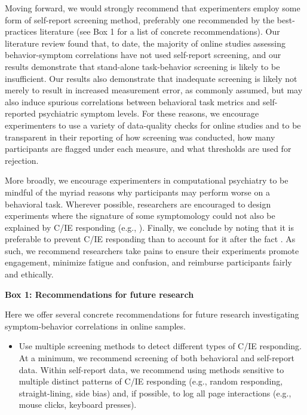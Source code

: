 \documentclass[a4paper,notitlepage,12pt]{article}
\begin{document}
\begin{refsection}[main]
Moving forward, we would strongly recommend that experimenters employ some form of self-report screening method, preferably one recommended by the best-practices literature (see Box 1 for a list of concrete recommendations). Our literature review found that, to date, the majority of online studies assessing behavior-symptom correlations have not used self-report screening, and our results demonstrate that stand-alone task-behavior screening is likely to be insufficient. Our results also demonstrate that inadequate screening is likely not merely to result in increased measurement error, as commonly assumed, but may also induce spurious correlations between behavioral task metrics and self-reported psychiatric symptom levels. For these reasons, we encourage experimenters to use a variety of data-quality checks for online studies and to be transparent in their reporting of how screening was conducted, how many participants are flagged under each measure, and what thresholds are used for rejection.

More broadly, we encourage experimenters in computational psychiatry to be mindful of the myriad reasons why participants may perform worse on a behavioral task. Wherever possible, researchers are encouraged to design experiments where the signature of some symptomology could not also be explained by C/IE responding (e.g., \cite{eldar2015interaction, hunter2019excessive}). Finally, we conclude by noting that it is preferable to prevent C/IE responding than to account for it after the fact \cite{ward2018applying}. As such, we recommend researchers take pains to ensure their experiments promote engagement, minimize fatigue and confusion, and reimburse participants fairly and ethically.

\newpage
\textbf{Box 1: Recommendations for future research}

Here we offer several concrete recommendations for future research investigating symptom-behavior correlations in online samples.

\begin{itemize}

    \item Use multiple screening methods to detect different types of C/IE responding. At a minimum, we recommend screening of both behavioral and self-report data. Within self-report data, we recommend using methods sensitive to multiple distinct patterns of C/IE responding (e.g., random responding, straight-lining, side bias) and, if possible, to log all page interactions (e.g., mouse clicks, keyboard presses).


\end{itemize}
\end{refsection}
\end{document}
